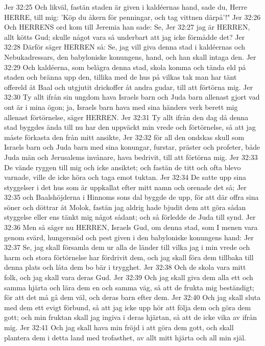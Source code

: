 Jer 32:25  Och likväl, fastän staden är given i kaldéernas hand, sade du, Herre HERRE, till mig: 'Köp du åkern för penningar, och tag vittnen därpå'!"
Jer 32:26  Och HERRENS ord kom till Jeremia han sade: Se,
Jer 32:27  jag är HERREN, allt kötts Gud; skulle något vara så underbart att jag icke förmådde det?
Jer 32:28  Därför säger HERREN så: Se, jag vill giva denna stad i kaldéernas och Nebukadressars, den babyloniske konungens, hand, och han skall intaga den.
Jer 32:29  Och kaldéerna, som belägra denna stad, skola komma och tända eld på staden och bränna upp den, tillika med de hus på vilkas tak man har tänt offereld åt Baal och utgjutit drickoffer åt andra gudar, till att förtörna mig.
Jer 32:30  Ty allt ifrån sin ungdom hava Israels barn och Juda barn allenast gjort vad ont är i mina ögon; ja, Israels barn hava med sina händers verk berett mig allenast förtörnelse, säger HERREN.
Jer 32:31  Ty allt ifrån den dag då denna stad byggdes ända till nu har den uppväckt min vrede och förtörnelse, så att jag måste förkasta den från mitt ansikte,
Jer 32:32  för all den ondskas skull som Israels barn och Juda barn med sina konungar, furstar, präster och profeter, både Juda män och Jerusalems invånare, hava bedrivit, till att förtörna mig.
Jer 32:33  De vände ryggen till mig och icke ansiktet; och fastän de titt och ofta blevo varnade, ville de icke höra och taga emot tuktan.
Jer 32:34  De satte upp sina styggelser i det hus som är uppkallat efter mitt namn och orenade det så;
Jer 32:35  och Baalshöjderna i Hinnoms sons dal byggde de upp, för att där offra sina söner och döttrar åt Molok, fastän jag aldrig hade bjudit dem att göra sådan styggelse eller ens tänkt mig något sådant; och så förledde de Juda till synd.
Jer 32:36  Men så säger nu HERREN, Israels Gud, om denna stad, som I menen vara genom svärd, hungersnöd och pest given i den babyloniske konungens hand:
Jer 32:37  Se, jag skall församla dem ur alla de länder till vilka jag i min vrede och harm och stora förtörnelse har fördrivit dem, och jag skall föra dem tillbaka till denna plats och låta dem bo bär i trygghet.
Jer 32:38  Och de skola vara mitt folk, och jag skall vara deras Gud.
Jer 32:39  Och jag skall giva dem alla ett och samma hjärta och lära dem en och samma väg, så att de frukta mig beständigt; för att det må gå dem väl, och deras barn efter dem.
Jer 32:40  Och jag skall sluta med dem ett evigt förbund, så att jag icke upp hör att följa dem och göra dem gott; och min fruktan skall jag ingiva i deras hjärtan, så att de icke vika av ifrån mig.
Jer 32:41  Och jag skall hava min fröjd i att göra dem gott, och skall plantera dem i detta land med trofasthet, av allt mitt hjärta och all min själ.
